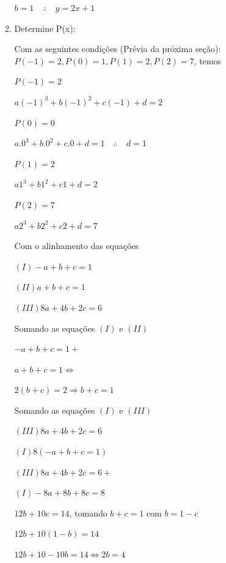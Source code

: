 \begin{multicols*}{2}
\begin{enumerate}
\begin{enumerate}
                        $b = 1 \quad \therefore \quad y = 2x + 1$

                  \item Determine P(x):

                        Com as seguintes condições (Prévia da próxima seção):
                        $P(-1) = 2, P(0) = 1, P(1) = 2, P(2) = 7$, temos

                        $P(-1) = 2$

                        $a(-1)^3 + b(-1)^2 + c(-1) + d = 2$

                        $P(0) = 0 $

                        $a.0^3 + b.0^2 + c.0 + d = 1 \quad \therefore \quad d = 1$

                        $P(1) = 2$

                        $a1^3 + b1^2 + c1 + d = 2$

                        $P(2) = 7$

                        $a2^3 + b2^2 + c2 + d = 7$

                        Com o alinhamento das equações

                        $(I) -a +b +c = 1$

                        $(II) a+b+c = 1$

                        $(III) 8a + 4b + 2c = 6$

                        Somando as equações $(I)$ e $(II)$

                        $-a +b +c = 1 +$

                        $a +b+ c = 1 \Leftrightarrow$

                        $2(b+c) = 2 \Rightarrow b+c = 1$

                        Somando as equações $(I)$ e $(III)$

                        $(III) 8a +4b + 2c = 6$

                        $(I) 8(-a+b+c = 1)$

                        $(III) 8a +4b + 2c = 6 +$

                        $(I) -8a+8b+8c = 8$

                        $12b + 10c = 14$, tomando $b+c =1$ com $b = 1 - c$

                        $12b +10(1-b) = 14$

                        $12b +10 -10b = 14 \Leftrightarrow 2b = 4$


\end{enumerate}
\end{enumerate}
\end{multicols*}
